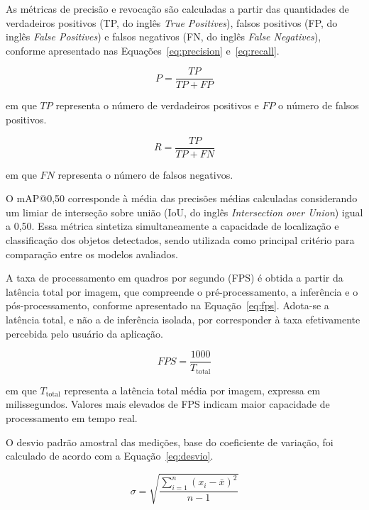 \documentclass[artigo,times,capa]{iftex2024}
\begin{document}
As métricas de precisão e revocação são calculadas a partir das quantidades de verdadeiros positivos (TP, do inglês \textit{True Positives}), falsos positivos (FP, do inglês \textit{False Positives}) e falsos negativos (FN, do inglês \textit{False Negatives}), conforme apresentado nas Equações~\ref{eq:precision} e~\ref{eq:recall}.

\begin{equation}
\label{eq:precision}
P=\frac{TP}{TP+FP}
\end{equation}

em que $TP$ representa o número de verdadeiros positivos e $FP$ o número de falsos positivos.

\begin{equation}
\label{eq:recall}
R=\frac{TP}{TP+FN}
\end{equation}

em que $FN$ representa o número de falsos negativos.

O \ac{mAP}@0,50 corresponde à média das precisões médias calculadas considerando um limiar de interseção sobre união (IoU, do inglês \textit{Intersection over Union}) igual a 0,50. Essa métrica sintetiza simultaneamente a capacidade de localização e classificação dos objetos detectados, sendo utilizada como principal critério para comparação entre os modelos avaliados.

A taxa de processamento em quadros por segundo (\ac{FPS}) é obtida a partir da latência total por imagem, que compreende o pré-processamento, a inferência e o pós-processamento, conforme apresentado na Equação~\ref{eq:fps}. Adota-se a latência total, e não a de inferência isolada, por corresponder à taxa efetivamente percebida pelo usuário da aplicação.

\begin{equation}
\label{eq:fps}
FPS=\frac{1000}{T_{\mathrm{total}}}
\end{equation}

em que $T_{\mathrm{total}}$ representa a latência total média por imagem, expressa em milissegundos. Valores mais elevados de \ac{FPS} indicam maior capacidade de processamento em tempo real.

O desvio padrão amostral das medições, base do coeficiente de variação, foi calculado de acordo com a Equação~\ref{eq:desvio}.

\begin{equation}
\label{eq:desvio}
\sigma=\sqrt{\frac{\sum_{i=1}^{n}(x_i-\bar{x})^2}{n-1}}
\end{equation}
\end{document}
